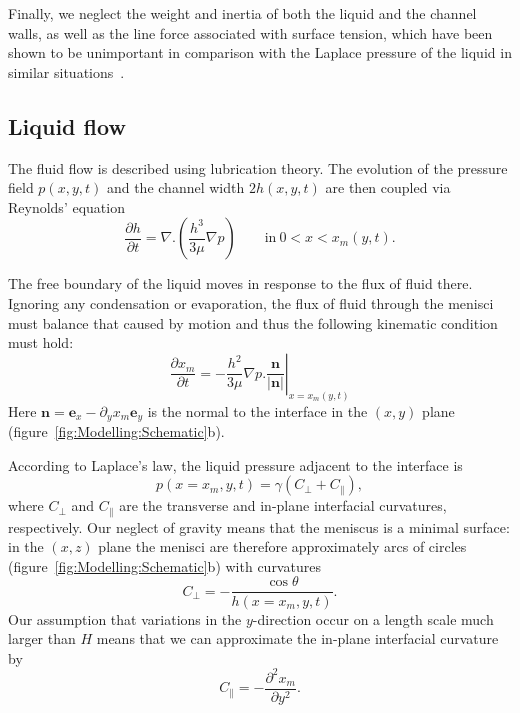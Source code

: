 \documentclass{jfm}
\newcommand{\ddp}[2]{\frac{\partial #1}{\partial #2}}
\begin{document}
Finally, we neglect the weight and inertia of both the liquid and the channel walls, as well as the line force associated with surface tension, which have been shown to be unimportant in comparison with the Laplace pressure of the liquid in similar situations~\citep{Taroni2012JFM, Bradley2019PRL, BradleyPhDthesis}.

\subsection{Liquid flow}
The fluid flow is described using lubrication theory. The evolution of the pressure field $p(x,y,t)$ and the channel width $2h(x,y,t)$ are then coupled via Reynolds' equation
\begin{equation}\label{E:Model:Liquid:Reynolds}
\ddp{h}{t} = \nabla.\left( \frac{h^3}{3\mu} \nabla p\right) \qquad \text{in}~0 < x < x_m(y,t).
\end{equation}

The free boundary of the liquid moves in response to the flux of fluid there. Ignoring any condensation or evaporation, the flux of fluid through the menisci must balance that caused by motion and thus the following kinematic condition must hold:
\begin{equation}\label{E:Model:Liquid:Kinematic}
\ddp{x_m}{t} = -\left.\frac{h^2}{3\mu}\nabla p .\frac{\mathbf{n}}{|\mathbf{n}|}\right|_{x = x_m(y,t)}
\end{equation}
Here $\mathbf{n} = \mathbf{e}_x -\partial_y x_m  \mathbf{e}_y$ is the normal to the interface in the $(x,y)$ plane (figure~\ref{fig:Modelling:Schematic}b).

According to Laplace's law, the liquid pressure adjacent to the interface is
\begin{equation}\label{E:Model:Liquid:LaplaceBC}
 p(x = x_m, y,t) = \gamma\left(C_{\perp} + C_{\parallel}\right),
\end{equation}
where $C_{\perp}$ and $C_{\parallel}$ are the transverse and in-plane interfacial curvatures, respectively. Our neglect of gravity means that the meniscus is a minimal surface: in the $(x,z)$ plane the menisci are therefore approximately arcs of circles (figure~\ref{fig:Modelling:Schematic}b) with curvatures
\begin{equation}\label{E:Model:Liquid:CPerp}
C_{\perp} = -\frac{\cos \theta}{h(x=x_m,y,t)}.
\end{equation}
Our assumption that variations in the $y$-direction occur on a length scale much larger than $H$ means that we can approximate the in-plane interfacial curvature by
\begin{equation}\label{E:Model:Liquid:CParallel}
C_{\parallel} = -\ddp{^2 x_m}{y^2}.
\end{equation}
\end{document}
